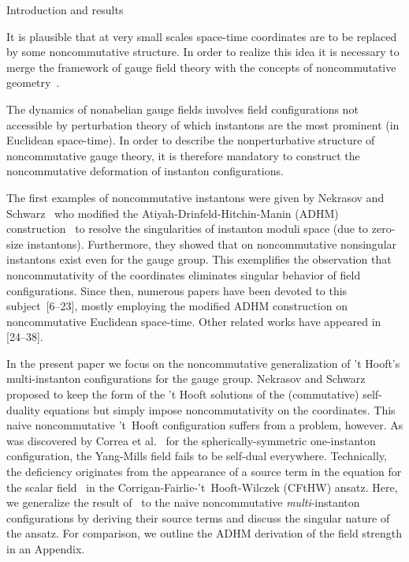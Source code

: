 \documentclass[a4paper,11pt]{article}
\makeatletter
\renewcommand{\section}{\@startsection{section}{1}{0pt}{\medskipamount}
{\medskipamount}{\large\bf}}
\numberwithin{equation}{section}
\providecommand{\R}{\mathbb R}
\makeatother
\begin{document}
\section{Introduction and results}

\noindent
It is plausible that at very small scales space-time coordinates are to
be replaced by some noncommutative structure. In order to realize this idea
it is necessary to merge the framework of gauge field theory with the
concepts of noncommutative geometry~\cite{Connes,Connes:1998cr,Seiberg:1999vs}.

The dynamics of nonabelian gauge fields involves field configurations
not accessible by perturbation theory of which instantons are the most
prominent (in Euclidean space-time). In order to describe the nonperturbative
structure of noncommutative gauge theory, it is therefore mandatory to
construct the noncommutative deformation of instanton configurations.

The first examples of noncommutative instantons were given by Nekrasov and
Schwarz~\cite{Nekrasov:1998ss} who modified the  
Atiyah-Drinfeld-Hitchin-Manin (ADHM) construction~\cite{Atiyah:1978ri} 
to resolve the singularities of instanton moduli space (due to zero-size
instantons).
{}Furthermore, they showed that on noncommutative \myHighlight{$\R^4$}\coordHE{} nonsingular 
instantons exist even for the \coordHE{} gauge group. This exemplifies the
observation that noncommutativity of the coordinates eliminates singular
behavior of field configurations.
Since then, numerous papers have been devoted to this subject~[6--23],
mostly employing the modified ADHM construction on noncommutative Euclidean 
space-time.  Other related works have appeared in [24--38].

In the present paper we focus on the noncommutative generalization of
't Hooft's multi-instanton configurations for the \coordHE{} gauge group.
Nekrasov and Schwarz~\cite{Nekrasov:1998ss} proposed to keep the form of the
't Hooft solutions of the (commutative) self-duality equations but simply
impose noncommutativity on the coordinates. 
This naive noncommutative 't~Hooft configuration suffers from a problem, 
however. As was discovered by Correa et al.~\cite{Correa:2001wv} for 
the spherically-symmetric one-instanton configuration,
the Yang-Mills field fails to be self-dual everywhere.
Technically, the deficiency originates from the appearance of a source term
in the equation for the scalar field~\myHighlight{$\phi$}\coordHE{} in the 
Corrigan-Fairlie-'t~Hooft-Wilczek (CFtHW) ansatz.
Here, we generalize the result of~\cite{Correa:2001wv} 
to the naive noncommutative {\it multi\/}-instanton configurations 
by deriving their source terms and discuss the singular nature of the ansatz.
For comparison, we outline the ADHM derivation of the field strength 
in an Appendix.
\end{document}
